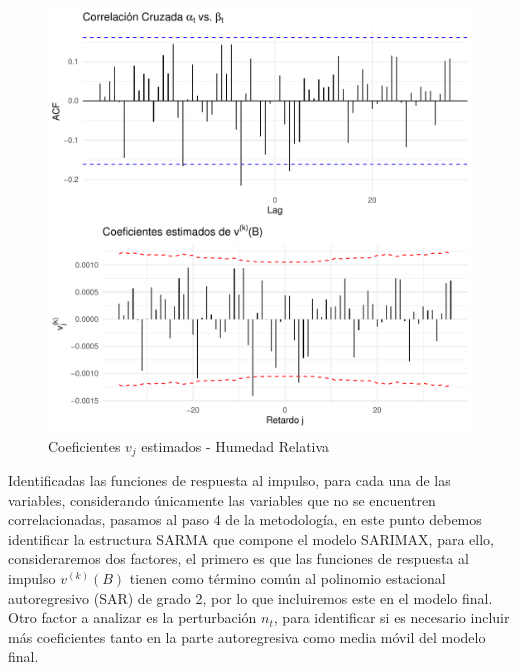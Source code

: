 \documentclass[12pt,oneside]{book}\usepackage[]{graphicx}\usepackage[]{color}
\makeatletter
\def\maxwidth{ %
  \ifdim\Gin@nat@width>\linewidth
    \linewidth
  \else
    \Gin@nat@width
  \fi
}
\newenvironment{knitrout}{}{} %
\theoremstyle{definition} %
\makeatother
\begin{document}
\begin{enumerate}
\begin{knitrout}
\color{fgcolor}\begin{figure}[H]

{\centering \includegraphics[width=\maxwidth]{figure/unnamed-chunk-43-1} 

}

\caption{\label{fig:vj4} Coeficientes $v_j$ estimados - Humedad Relativa }\label{fig:unnamed-chunk-43}
\end{figure}


\end{knitrout}



\end{enumerate}


Identificadas las funciones de respuesta al impulso, para cada una de las variables, considerando únicamente las variables que no se encuentren correlacionadas, 
pasamos al paso 4 de la metodología, en este punto debemos identificar la estructura SARMA que compone el modelo SARIMAX, para ello, consideraremos dos factores, el primero es que las funciones de respuesta al impulso $v^{(k)}(B)$ tienen como término común al polinomio estacional autoregresivo  (SAR) de grado 2, por lo que incluiremos este en el modelo final. Otro factor a analizar es la perturbación $n_t$, para identificar si es necesario incluir más coeficientes tanto en la parte autoregresiva como media móvil del modelo final.
\end{document}
